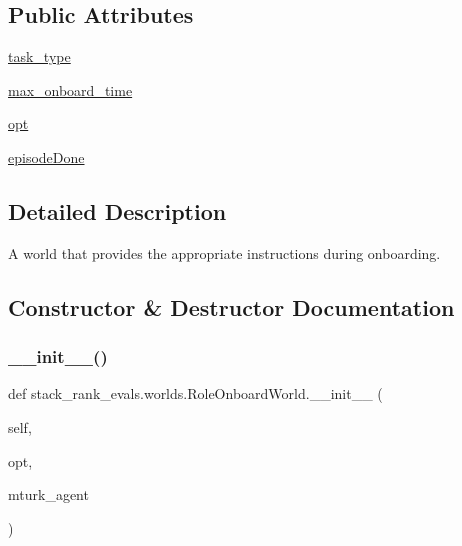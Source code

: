 \subsection*{Public Attributes}
\begin{DoxyCompactItemize}
\item 
\hyperlink{classstack__rank__evals_1_1worlds_1_1RoleOnboardWorld_af8109c2ced237355a055ad67e7436a65}{task\+\_\+type}
\item 
\hyperlink{classstack__rank__evals_1_1worlds_1_1RoleOnboardWorld_a66d9e43741be6eee3262e5ffc47fb147}{max\+\_\+onboard\+\_\+time}
\item 
\hyperlink{classstack__rank__evals_1_1worlds_1_1RoleOnboardWorld_a986c8464db53b9d32da815609b44392d}{opt}
\item 
\hyperlink{classstack__rank__evals_1_1worlds_1_1RoleOnboardWorld_a80faeeeacacbf4babca6b7a66d6716bd}{episode\+Done}
\end{DoxyCompactItemize}


\subsection{Detailed Description}
\begin{DoxyVerb}A world that provides the appropriate instructions during onboarding.
\end{DoxyVerb}
 

\subsection{Constructor \& Destructor Documentation}
\mbox{\label{classstack__rank__evals_1_1worlds_1_1RoleOnboardWorld_a93c85daae3056c33bc77b6159ce43b57}} 
\subsubsection{\texorpdfstring{\+\_\+\+\_\+init\+\_\+\+\_\+()}{\_\_init\_\_()}\hspace{0.1cm}{\footnotesize\ttfamily [1/2]}}
{\footnotesize\ttfamily def stack\+\_\+rank\+\_\+evals.\+worlds.\+Role\+Onboard\+World.\+\_\+\+\_\+init\+\_\+\+\_\+ (\begin{DoxyParamCaption}\item[{}]{self,  }\item[{}]{opt,  }\item[{}]{mturk\+\_\+agent }\end{DoxyParamCaption})}

